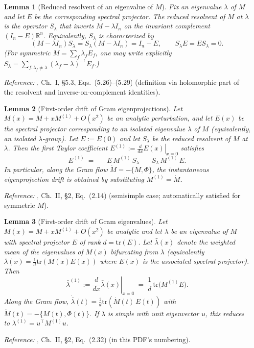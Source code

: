 \documentclass{article}
\theoremstyle{plain}
\newtheorem{lemma}{Lemma}[section]
\numberwithin{equation}{section}
\theoremstyle{definition}
\theoremstyle{remark}
\begin{document}
\begin{lemmaproofbox}
\begin{lemma}[Reduced resolvent of an eigenvalue of $M$]\label{lemma:kato-reduced-resolvent}
Fix an eigenvalue $\lambda$ of $M$ and let $E$ be the corresponding spectral projector.
The reduced resolvent of $M$ at $\lambda$ is the operator $S_\lambda$ that inverts $M-\lambda I_n$
on the invariant complement $(I_n-E)\mathbb{R}^n$.
Equivalently, $S_\lambda$ is characterized by
\[
(M-\lambda I_n)S_\lambda = S_\lambda(M-\lambda I_n)=I_n-E,
\qquad
S_\lambda E = ES_\lambda = 0.
\]
(For symmetric $M=\sum_f \lambda_f E_f$, one may write explicitly
$S_\lambda = \sum_{f:\lambda_f\neq \lambda}(\lambda_f-\lambda)^{-1}E_f$.)
\end{lemma}
\end{lemmaproofbox}
\noindent\textit{Reference:} \citep{kato}, Ch.~I, \S 5.3, Eqs.~(5.26)--(5.29) (definition via holomorphic part of the resolvent and inverse-on-complement identities).

\begin{lemmaproofbox}
\begin{lemma}[First-order drift of Gram eigenprojections]\label{lemma:kato-eigenprojection-coeff}
Let $M(x)=M + xM^{(1)} + O(x^2)$ be an analytic perturbation, and let $E(x)$ be the spectral projector
corresponding to an isolated eigenvalue $\lambda$ of $M$ (equivalently, an isolated $\lambda$-group).
Let $E:=E(0)$ and let $S_\lambda$ be the reduced resolvent of $M$ at $\lambda$.
Then the first Taylor coefficient $E^{(1)} := \left.\frac{d}{dx}E(x)\right|_{x=0}$ satisfies
\[
E^{(1)} \;=\; -\,E\,M^{(1)}\,S_\lambda \;-\; S_\lambda\,M^{(1)}\,E.
\]
In particular, along the Gram flow $\dot M=-\{M,\Phi\}$, the instantaneous eigenprojection drift is obtained by substituting
$M^{(1)}=\dot M$.
\end{lemma}
\end{lemmaproofbox}
\noindent\textit{Reference:} \citep{kato}, Ch.~II, \S 2, Eq.~(2.14) (semisimple case; automatically satisfied for symmetric $M$).

\begin{lemmaproofbox}
\begin{lemma}[First-order drift of Gram eigenvalues]\label{lemma:kato-eigenvalue-coeff}
Let $M(x)=M + xM^{(1)} + O(x^2)$ be analytic and let $\lambda$ be an eigenvalue of $M$
with spectral projector $E$ of rank $d=\mathrm{tr}(E)$.
Let $\bar\lambda(x)$ denote the \emph{weighted mean} of the eigenvalues of $M(x)$ bifurcating from $\lambda$
(equivalently $\bar\lambda(x)=\frac{1}{d}\mathrm{tr}(M(x)E(x))$ where $E(x)$ is the associated spectral projector).
Then
\[
\bar\lambda^{(1)} := \left.\frac{d}{dx}\bar\lambda(x)\right|_{x=0}
\;=\;
\frac{1}{d}\,\mathrm{tr}\!\big(M^{(1)}E\big).
\]
Along the Gram flow, $\dot{\bar\lambda}(t)=\frac{1}{d}\mathrm{tr}(\dot M(t)\,E(t))$ with $\dot M(t)=-\{M(t),\Phi(t)\}$.
If $\lambda$ is simple with unit eigenvector $u$, this reduces to $\lambda^{(1)} = u^\top M^{(1)}u$.
\end{lemma}
\end{lemmaproofbox}
\noindent\textit{Reference:} \citep{kato}, Ch.~II, \S 2, Eq.~(2.32) (in this PDF’s numbering).
\end{document}
